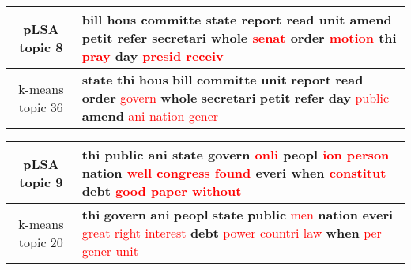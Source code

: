 \begin{center}\begin{tabularx}{\textwidth} {
  | c | >{\raggedright\arraybackslash}X | } \hline 
pLSA topic 8 & \textbf{bill} \textbf{hous} \textbf{committe} \textbf{state} \textbf{report} \textbf{read} \textbf{unit} \textbf{amend} \textbf{petit} \textbf{refer} \textbf{secretari} \textbf{whole} \textcolor{red}{senat} \textbf{order} \textcolor{red}{motion} \textbf{thi} \textcolor{red}{pray} \textbf{day} \textcolor{red}{presid} \textcolor{red}{receiv} \\ \hline 
k-means topic 36 & \textbf{state} \textbf{thi} \textbf{hous} \textbf{bill} \textbf{committe} \textbf{unit} \textbf{report} \textbf{read} \textbf{order} \textcolor{red}{govern} \textbf{whole} \textbf{secretari} \textbf{petit} \textbf{refer} \textbf{day} \textcolor{red}{public} \textbf{amend} \textcolor{red}{ani} \textcolor{red}{nation} \textcolor{red}{gener} \\ \hline 
\end{tabularx}

\end{center}

\begin{center}\begin{tabularx}{\textwidth} {
  | c | >{\raggedright\arraybackslash}X | } \hline 
pLSA topic 9 & \textbf{thi} \textbf{public} \textbf{ani} \textbf{state} \textbf{govern} \textcolor{red}{onli} \textbf{peopl} \textcolor{red}{ion} \textcolor{red}{person} \textbf{nation} \textcolor{red}{well} \textcolor{red}{congress} \textcolor{red}{found} \textbf{everi} \textbf{when} \textcolor{red}{constitut} \textbf{debt} \textcolor{red}{good} \textcolor{red}{paper} \textcolor{red}{without} \\ \hline 
k-means topic 20 & \textbf{thi} \textbf{govern} \textbf{ani} \textbf{peopl} \textbf{state} \textbf{public} \textcolor{red}{men} \textbf{nation} \textbf{everi} \textcolor{red}{great} \textcolor{red}{right} \textcolor{red}{interest} \textbf{debt} \textcolor{red}{power} \textcolor{red}{countri} \textcolor{red}{law} \textbf{when} \textcolor{red}{per} \textcolor{red}{gener} \textcolor{red}{unit} \\ \hline 
\end{tabularx}

\end{center}

